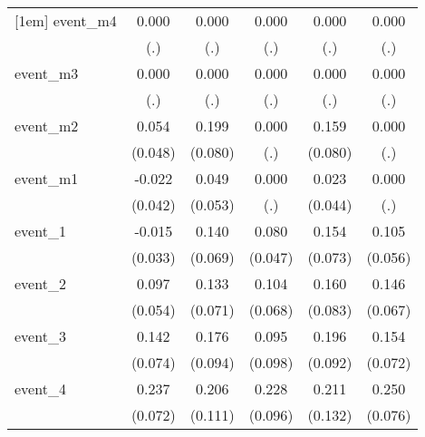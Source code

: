 {\begin{tabular}{l*{5}{c}}
[1em]
event\_m4    &       0.000         &       0.000         &       0.000         &       0.000         &       0.000         \\
            &         (.)         &         (.)         &         (.)         &         (.)         &         (.)         \\
[1em]
event\_m3    &       0.000         &       0.000         &       0.000         &       0.000         &       0.000         \\
            &         (.)         &         (.)         &         (.)         &         (.)         &         (.)         \\
[1em]
event\_m2    &       0.054         &       0.199\sym{*}  &       0.000         &       0.159\sym{*}  &       0.000         \\
            &     (0.048)         &     (0.080)         &         (.)         &     (0.080)         &         (.)         \\
[1em]
event\_m1    &      -0.022         &       0.049         &       0.000         &       0.023         &       0.000         \\
            &     (0.042)         &     (0.053)         &         (.)         &     (0.044)         &         (.)         \\
[1em]
event\_1     &      -0.015         &       0.140\sym{*}  &       0.080         &       0.154\sym{*}  &       0.105         \\
            &     (0.033)         &     (0.069)         &     (0.047)         &     (0.073)         &     (0.056)         \\
[1em]
event\_2     &       0.097         &       0.133         &       0.104         &       0.160         &       0.146\sym{*}  \\
            &     (0.054)         &     (0.071)         &     (0.068)         &     (0.083)         &     (0.067)         \\
[1em]
event\_3     &       0.142         &       0.176         &       0.095         &       0.196\sym{*}  &       0.154\sym{*}  \\
            &     (0.074)         &     (0.094)         &     (0.098)         &     (0.092)         &     (0.072)         \\
[1em]
event\_4     &       0.237\sym{**} &       0.206         &       0.228\sym{*}  &       0.211         &       0.250\sym{**} \\
            &     (0.072)         &     (0.111)         &     (0.096)         &     (0.132)         &     (0.076)         \\

\end{tabular}}
